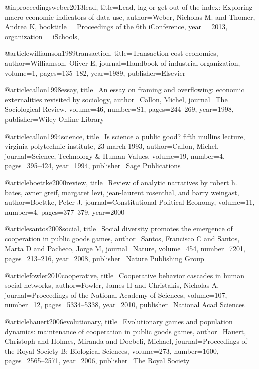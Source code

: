 @inproceedings{weber2013lead,
  title={Lead, lag or get out of the index: Exploring macro-economic indicators of data use},
  author={Weber, Nicholas M. and Thomer, Andrea K},
  booktitle = {Proceedings of the 6th iConference},
  year = {2013},
  organization = {iSchools},
}

@article{williamson1989transaction,
  title={Transaction cost economics},
  author={Williamson, Oliver E},
  journal={Handbook of industrial organization},
  volume={1},
  pages={135--182},
  year={1989},
  publisher={Elsevier}
}

@article{callon1998essay,
  title={An essay on framing and overflowing: economic externalities revisited by sociology},
  author={Callon, Michel},
  journal={The Sociological Review},
  volume={46},
  number={S1},
  pages={244--269},
  year={1998},
  publisher={Wiley Online Library}
}

@article{callon1994science,
  title={Is science a public good? fifth mullins lecture, virginia polytechnic institute, 23 march 1993},
  author={Callon, Michel},
  journal={Science, Technology \& Human Values},
  volume={19},
  number={4},
  pages={395--424},
  year={1994},
  publisher={Sage Publications}
}

@article{boettke2000review,
  title={Review of analytic narratives by robert h. bates, avner greif, margaret levi, jean-laurent rosenthal, and barry weingast},
  author={Boettke, Peter J},
  journal={Constitutional Political Economy},
  volume={11},
  number={4},
  pages={377--379},
  year={2000}
}



@article{santos2008social,
  title={Social diversity promotes the emergence of cooperation in public goods games},
  author={Santos, Francisco C and Santos, Marta D and Pacheco, Jorge M},
  journal={Nature},
  volume={454},
  number={7201},
  pages={213--216},
  year={2008},
  publisher={Nature Publishing Group}
}

@article{fowler2010cooperative,
  title={Cooperative behavior cascades in human social networks},
  author={Fowler, James H and Christakis, Nicholas A},
  journal={Proceedings of the National Academy of Sciences},
  volume={107},
  number={12},
  pages={5334--5338},
  year={2010},
  publisher={National Acad Sciences}
}

@article{hauert2006evolutionary,
  title={Evolutionary games and population dynamics: maintenance of cooperation in public goods games},
  author={Hauert, Christoph and Holmes, Miranda and Doebeli, Michael},
  journal={Proceedings of the Royal Society B: Biological Sciences},
  volume={273},
  number={1600},
  pages={2565--2571},
  year={2006},
  publisher={The Royal Society}
}

